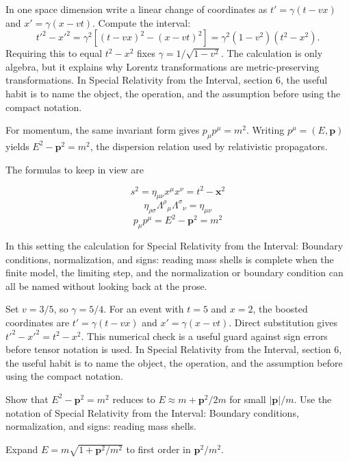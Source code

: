 In one space dimension write a linear change of coordinates as \(t'=\gamma(t-vx)\) and \(x'=\gamma(x-vt)\).  Compute the interval:
\[
  t'^2-x'^2
  =
  \gamma^2[(t-vx)^2-(x-vt)^2]
  =
  \gamma^2(1-v^2)(t^2-x^2).
\]
Requiring this to equal \(t^2-x^2\) fixes \(\gamma=1/\sqrt{1-v^2}\).  The calculation is only algebra, but it explains why Lorentz transformations are metric-preserving transformations.  In Special Relativity from the Interval, section 6, the useful habit is to name the object, the operation, and the assumption before using the compact notation.

For momentum, the same invariant form gives \(p_\mu p^\mu=m^2\).  Writing \(p^\mu=(E,\bm p)\) yields \(E^2-\bm p^2=m^2\), the dispersion relation used by relativistic propagators.

The formulas to keep in view are

\[
  s^2=\eta_{\mu\nu}x^\mu x^\nu=t^2-\bm x^2
\]
\[
  \eta_{\rho\sigma}\Lambda^\rho{}_\mu\Lambda^\sigma{}_\nu=\eta_{\mu\nu}
\]
\[
  p_\mu p^\mu=E^2-\bm p^2=m^2
\]

In this setting the calculation for Special Relativity from the Interval: Boundary conditions, normalization, and signs: reading mass shells is complete when the finite model, the limiting step, and the normalization or boundary condition can all be named without looking back at the prose.




\begin{example}
Set \(v=3/5\), so \(\gamma=5/4\).  For an event with \(t=5\) and \(x=2\), the boosted coordinates are \(t'=\gamma(t-vx)\) and \(x'=\gamma(x-vt)\).  Direct substitution gives \(t'^2-x'^2=t^2-x^2\).  This numerical check is a useful guard against sign errors before tensor notation is used.  In Special Relativity from the Interval, section 6, the useful habit is to name the object, the operation, and the assumption before using the compact notation.
\end{example}



\begin{exercise}
Show that \(E^2-\bm p^2=m^2\) reduces to \(E\approx m+\bm p^2/2m\) for small \(|\bm p|/m\).  Use the notation of Special Relativity from the Interval: Boundary conditions, normalization, and signs: reading mass shells.
\begin{answer}
Expand \(E=m\sqrt{1+\bm p^2/m^2}\) to first order in \(\bm p^2/m^2\).
\end{answer}
\end{exercise}

